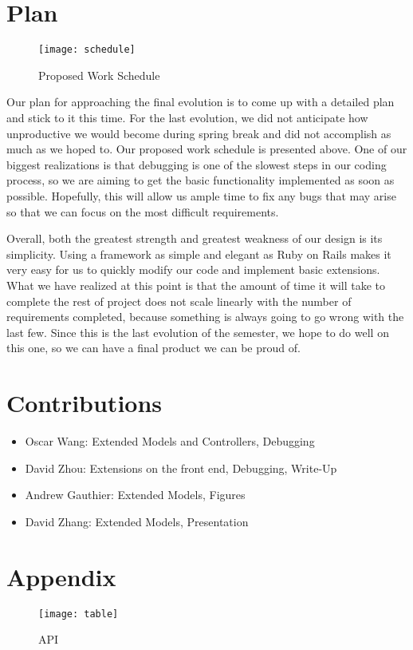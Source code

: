 \documentclass{article}
\begin{document}
\section{Plan}
\begin{figure}[h]
\centering
\texttt{[image: schedule]}
\caption{Proposed Work Schedule}
\end{figure}
Our plan for approaching the final evolution is to come up with a detailed plan and stick to it this time.  For the last evolution, we did not anticipate how unproductive we would become during spring break and did not accomplish as much as we hoped to.  Our proposed work schedule is presented above.  One of our biggest realizations is that debugging is one of the slowest steps in our coding process, so we are aiming to get the basic functionality implemented as soon as possible.  Hopefully, this will allow us ample time to fix any bugs that may arise so that we can focus on the most difficult requirements.\par

Overall, both the greatest strength and greatest weakness of our design is its simplicity.  Using a framework as simple and elegant as Ruby on Rails makes it very easy for us to quickly modify our code and implement basic extensions.  What we have realized at this point is that the amount of time it will take to complete the rest of project does not scale linearly with the number of requirements completed, because something is always going to go wrong with the last few.  Since this is the last evolution of the semester, we hope to do well on this one, so we can have a final product we can be proud of.

\section{Contributions}
\begin{itemize}
\item{Oscar Wang: Extended Models and Controllers, Debugging}
\item{David Zhou: Extensions on the front end, Debugging, Write-Up}
\item{Andrew Gauthier: Extended Models, Figures}
\item{David Zhang: Extended Models, Presentation}
\end{itemize}
\section{Appendix}

\begin{figure}[h]
\centering
\texttt{[image: table]}
\caption{API}
\end{figure}
\end{document}
